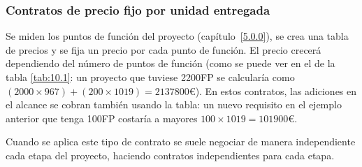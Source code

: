 \documentclass[12pt]{article}
\begin{document}
\subsubsection{Contratos de precio fijo por unidad entregada}
\label{10.2.3}

{Se miden los puntos de función del proyecto (capítulo~\ref{5.0.0}), se crea una tabla de precios y se fija un precio por cada punto de función. El precio crecerá dependiendo del número de puntos de función (como se puede ver en el  de la tabla \ref{tab:10.1}: un proyecto que tuviese 2200FP se calcularía como $(2000\times967) + (200\times1019) = 2137800€$). En estos contratos, las adiciones en el alcance se cobran también usando la tabla: un nuevo requisito en el ejemplo anterior que tenga 100FP costaría a mayores $100\times1019=101900€$.}

\begin{table}[ht]
\centering
{}
\caption{Ejemplo de cálculo de precios}
\label{tab:10.1}
\end{table}

{Cuando se aplica este tipo de contrato se suele negociar de manera independiente cada etapa del proyecto, haciendo contratos independientes para cada etapa.}
\end{document}
